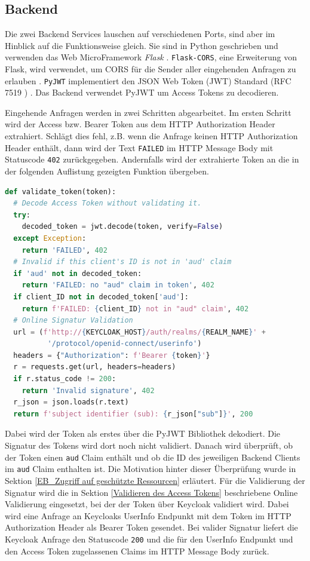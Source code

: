 \subsection{Backend} \label{EB_Backend}

Die zwei Backend Services lauschen auf verschiedenen Ports, sind aber im Hinblick auf die Funktionsweise gleich. Sie sind in Python geschrieben und verwenden das Web MicroFramework \textit{Flask} \cite{EB48}. \texttt{Flask-CORS}, eine Erweiterung von Flask, wird verwendet, um CORS für die Sender aller eingehenden Anfragen zu erlauben \cite{EB49}. \texttt{PyJWT} implementiert den JSON Web Token (JWT) Standard (RFC 7519 \cite{RFC7519}) \cite{EB51}. Das Backend verwendet PyJWT um Access Tokens zu decodieren.

Eingehende Anfragen werden in zwei Schritten abgearbeitet. Im ersten Schritt wird der Access bzw. Bearer Token aus dem HTTP Authorization Header extrahiert. Schlägt dies fehl, z.B. wenn die Anfrage keinen HTTP Authorization Header enthält, dann wird der Text \texttt{FAILED} im HTTP Message Body mit Statuscode \texttt{402} zurückgegeben. Andernfalls wird der extrahierte Token an die in der folgenden Auflistung gezeigten Funktion übergeben.

\begin{lstlisting}[caption=Token Validierung im Backend, captionpos=b, language=python, label=validateTokenFunction]
def validate_token(token):
  # Decode Access Token without validating it.
  try:
    decoded_token = jwt.decode(token, verify=False)
  except Exception:
    return 'FAILED', 402
  # Invalid if this client's ID is not in 'aud' claim
  if 'aud' not in decoded_token:
    return 'FAILED: no "aud" claim in token', 402
  if client_ID not in decoded_token['aud']:
    return f'FAILED: {client_ID} not in "aud" claim', 402
  # Online Signatur Validation
  url = (f'http://{KEYCLOAK_HOST}/auth/realms/{REALM_NAME}' +
          '/protocol/openid-connect/userinfo')
  headers = {"Authorization": f'Bearer {token}'}
  r = requests.get(url, headers=headers)
  if r.status_code != 200:
    return 'Invalid signature', 402
  r_json = json.loads(r.text)
  return f'subject identifier (sub): {r_json["sub"]}', 200
\end{lstlisting} %

Dabei wird der Token als erstes über die PyJWT Bibliothek dekodiert. Die Signatur des Tokens wird dort noch nicht validiert. Danach wird überprüft, ob der Token einen \texttt{aud} Claim enthält und ob die ID des jeweiligen Backend Clients im \texttt{aud} Claim enthalten ist. Die Motivation hinter dieser Überprüfung wurde in Sektion \ref{EB_Zugriff auf geschützte Ressourcen} erläutert. Für die Validierung der Signatur wird die in Sektion \ref{Validieren des Access Tokens} beschriebene Online Validierung eingesetzt, bei der der Token über Keycloak validiert wird. Dabei wird eine Anfrage an Keycloaks UserInfo Endpunkt mit dem Token im HTTP Authorization Header als Bearer Token gesendet. Bei valider Signatur liefert die Keycloak Anfrage den Statuscode \texttt{200} und die für den UserInfo Endpunkt und den Access Token zugelassenen Claims im HTTP Message Body zurück. 

